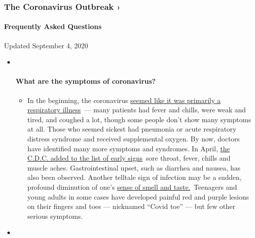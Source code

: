 \hypertarget{the-coronavirus-outbreak-}{%
\subsubsection{The Coronavirus Outbreak
›}\label{the-coronavirus-outbreak-}}

\hypertarget{frequently-asked-questions}{%
\paragraph{Frequently Asked
Questions}\label{frequently-asked-questions}}

Updated September 4, 2020

\begin{itemize}
\item ~
  \hypertarget{what-are-the-symptoms-of-coronavirus}{%
  \paragraph{What are the symptoms of
  coronavirus?}\label{what-are-the-symptoms-of-coronavirus}}

  \begin{itemize}
  \tightlist
  \item
    In the beginning, the coronavirus
    \href{https://www.nytimes3xbfgragh.onion/article/coronavirus-facts-history.html?action=click\&pgtype=Article\&state=default\&region=MAIN_CONTENT_3\&context=storylines_faq\#link-6817bab5}{seemed
    like it was primarily a respiratory illness}~--- many patients had
    fever and chills, were weak and tired, and coughed a lot, though
    some people don't show many symptoms at all. Those who seemed
    sickest had pneumonia or acute respiratory distress syndrome and
    received supplemental oxygen. By now, doctors have identified many
    more symptoms and syndromes. In April,
    \href{https://www.nytimes3xbfgragh.onion/2020/04/27/health/coronavirus-symptoms-cdc.html?action=click\&pgtype=Article\&state=default\&region=MAIN_CONTENT_3\&context=storylines_faq}{the
    C.D.C. added to the list of early signs}~sore throat, fever, chills
    and muscle aches. Gastrointestinal upset, such as diarrhea and
    nausea, has also been observed. Another telltale sign of infection
    may be a sudden, profound diminution of one's
    \href{https://www.nytimes3xbfgragh.onion/2020/03/22/health/coronavirus-symptoms-smell-taste.html?action=click\&pgtype=Article\&state=default\&region=MAIN_CONTENT_3\&context=storylines_faq}{sense
    of smell and taste.}~Teenagers and young adults in some cases have
    developed painful red and purple lesions on their fingers and toes
    --- nicknamed ``Covid toe'' --- but few other serious symptoms.
  \end{itemize}
\item ~
  \hypertarget{why-is-it-safer-to-spend-time-together-outside}{%
}
\end{itemize}
